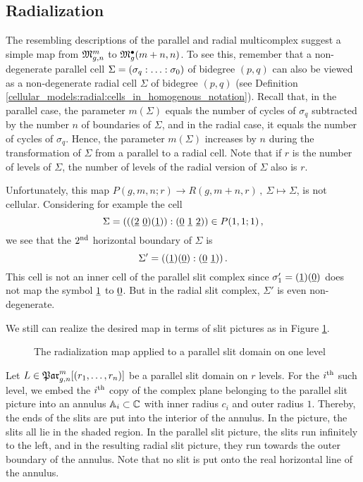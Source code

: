 \subsection{Radialization}
\label{cellular_radialization}

The resembling descriptions of the parallel and radial multicomplex suggest a simple map from $\Modspc$ to $\ModspcRadm[m+n]$.
To see this, remember that a non-degenerate parallel cell $\Sigma = \homogq$ of bidegree $(p, q)$ can also be viewed as a non-degenerate radial cell $\Sigma$ of bidegree $(p, q)$ 
(see Definition \ref{cellular_models:radial:cells_in_homogenous_notation}).
Recall that, in the parallel case, the parameter $m(\Sigma)$ equals the number of cycles of $\sigma_q$ subtracted by the number $n$ of boundaries of $\Sigma$, 
and in the radial case, it equals the number of cycles of $\sigma_q$.
Hence, the parameter $m(\Sigma)$ increases by $n$ during the transformation of $\Sigma$ from a parallel to a radial cell.
Note that if $r$ is the number of levels of $\Sigma$, the number of levels of the radial version of $\Sigma$ also is $r$.

Unfortunately, this map $P(g, m, n; r) \to R(g, m + n, r)\,,\ \Sigma \mapsto \Sigma$, is not cellular. 
Considering for example the cell 
\[ 
   \Sigma = (((\ul 2 \ \ul 0) (\ul 1)) : (\ul 0 \ \ul 1 \ \ul 2)) \in P(1, 1; 1) \,,
\]
we see that the $2\nd$ horizontal boundary of $\Sigma$ is 
\[
   \Sigma' = ((\ul 1) (\ul 0) : (\ul 0 \ \ul 1))\,.
\]
This cell is not an inner cell of the parallel slit complex since $\sigma'_1 = (\ul 1)(\ul 0)$ does not map the symbol $\ul 1$ to $\ul 0$.
But in the radial slit complex, $\Sigma'$ is even non-degenerate.

We still can realize the desired map in terms of slit pictures as in Figure \ref{cellular_radialization_on_complexes}.
\begin{figure}[ht]
\centering
{}
\caption{\label{cellular_radialization_on_complexes} The radialization map applied to a parallel slit domain on one level}
\end{figure}
Let $L \in \Parr$ be a parallel slit domain on $r$ levels.
For the $i\Th$ such level, we embed the $i\Th$ copy of the complex plane belonging to the parallel slit picture into an annulus $\A_i \subset \C$ with inner radius $c_i$ and outer radius $1$.
Thereby, the ends of the slits are put into the interior of the annulus.
In the picture, the slits all lie in the shaded region.
In the parallel slit picture, the slits run infinitely to the left, and in the resulting radial slit picture, they run towards the outer boundary of the annulus.
Note that no slit is put onto the real horizontal line of the annulus.

